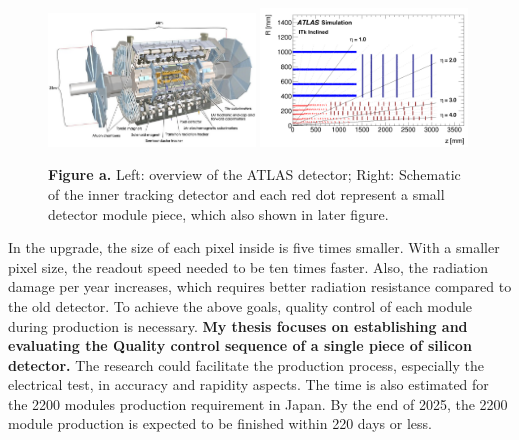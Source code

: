 \documentclass{article}
\begin{document}
\begin{figure}[h]
  \begin{center}
    \includegraphics[width=0.49\textwidth]{thesispic/ch2_ATLAS.jpeg}
    \includegraphics[width=0.49\textwidth]{thesispic/ch2_Pixel_Layout.png}
    \caption*{\textbf{Figure a.} Left: overview of the ATLAS detector; Right: Schematic of the 
    inner tracking detector and each red dot represent a small detector 
    module piece, which also shown in later figure. }
  \end{center}
\end{figure}


In the upgrade, the size of each pixel inside is five times smaller.
 With a smaller pixel size, the readout speed needed to be ten times faster. 
 Also, the radiation damage per year increases, which requires better radiation 
 resistance compared to the old detector. To achieve the above goals, 
 quality control of each module during production is necessary. \textbf{
 My thesis focuses on establishing and evaluating the Quality control
  sequence of a single piece of silicon detector. }
  The research could facilitate the production process, especially the electrical test, 
  in accuracy and rapidity aspects. The time is also estimated 
  for the 2200 modules production requirement in Japan. By the end of 2025, the 2200 module 
production is expected to be finished within 220 days or less. 
\end{document}
